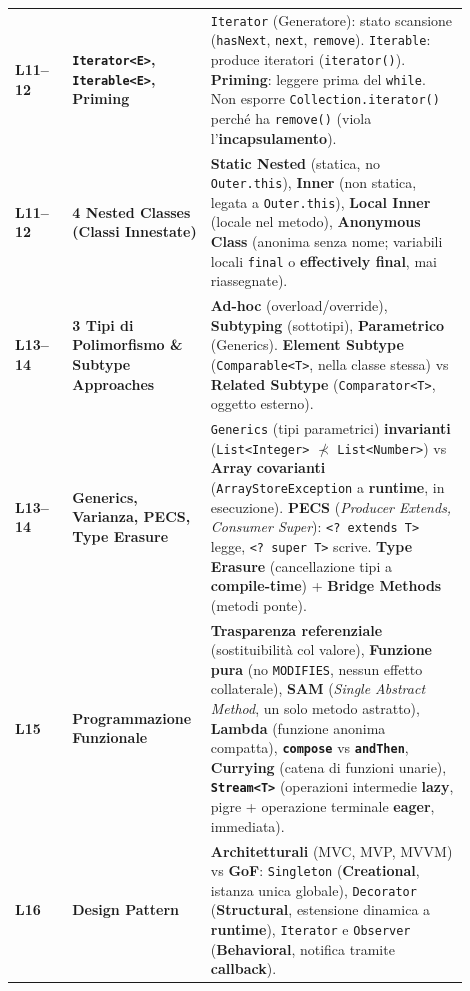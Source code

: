 \begin{longtable}{>{\raggedright\arraybackslash}p{0.12\linewidth}>{\raggedright\arraybackslash}p{0.24\linewidth}>{\raggedright\arraybackslash}p{0.54\linewidth}}
\textbf{L11–12} & \textbf{\texttt{Iterator<E>}, \texttt{Iterable<E>}, Priming} & \texttt{Iterator} (Generatore): stato scansione (\texttt{hasNext}, \texttt{next}, \texttt{remove}). \texttt{Iterable}: produce iteratori (\texttt{iterator()}). \textbf{Priming}: leggere prima del \texttt{while}. Non esporre \texttt{Collection.iterator()} perché ha \texttt{remove()} (viola l'\textbf{incapsulamento}). \\

\textbf{L11–12} & \textbf{4 Nested Classes (Classi Innestate)} & \textbf{Static Nested} (statica, no \texttt{Outer.this}), \textbf{Inner} (non statica, legata a \texttt{Outer.this}), \textbf{Local Inner} (locale nel metodo), \textbf{Anonymous Class} (anonima senza nome; variabili locali \texttt{final} o \textbf{effectively final}, mai riassegnate). \\

\textbf{L13–14} & \textbf{3 Tipi di Polimorfismo \& Subtype Approaches} & \textbf{Ad-hoc} (overload/override), \textbf{Subtyping} (sottotipi), \textbf{Parametrico} (Generics). \textbf{Element Subtype} (\texttt{Comparable<T>}, nella classe stessa) vs \textbf{Related Subtype} (\texttt{Comparator<T>}, oggetto esterno). \\

\textbf{L13–14} & \textbf{Generics, Varianza, PECS, Type Erasure} & \texttt{Generics} (tipi parametrici) \textbf{invarianti} (\texttt{List<Integer>} $\not\prec$ \texttt{List<Number>}) vs \textbf{Array} \textbf{covarianti} (\texttt{ArrayStoreException} a \textbf{runtime}, in esecuzione). \textbf{PECS} (\emph{Producer Extends, Consumer Super}): \texttt{<? extends T>} legge, \texttt{<? super T>} scrive. \textbf{Type Erasure} (cancellazione tipi a \textbf{compile-time}) + \textbf{Bridge Methods} (metodi ponte). \\

\textbf{L15} & \textbf{Programmazione Funzionale} & \textbf{Trasparenza referenziale} (sostituibilità col valore), \textbf{Funzione pura} (no \texttt{MODIFIES}, nessun effetto collaterale), \textbf{SAM} (\emph{Single Abstract Method}, un solo metodo astratto), \textbf{Lambda} (funzione anonima compatta), \textbf{\texttt{compose}} vs \textbf{\texttt{andThen}}, \textbf{Currying} (catena di funzioni unarie), \textbf{\texttt{Stream<T>}} (operazioni intermedie \textbf{lazy}, pigre + operazione terminale \textbf{eager}, immediata). \\

\textbf{L16} & \textbf{Design Pattern} & \textbf{Architetturali} (MVC, MVP, MVVM) vs \textbf{GoF}: \texttt{Singleton} (\textbf{Creational}, istanza unica globale), \texttt{Decorator} (\textbf{Structural}, estensione dinamica a \textbf{runtime}), \texttt{Iterator} e \texttt{Observer} (\textbf{Behavioral}, notifica tramite \textbf{callback}). \\

\bottomrule

\end{longtable}
\endgroup

